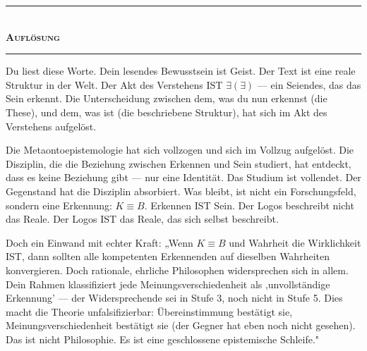 \documentclass[10pt, openany, oneside]{book}
\renewcommand{\normalsize}{\fontsize{10}{13}\selectfont}
\begin{document}
\vspace{1.5em}


\begin{center}
    \rule{0.3\textwidth}{0.4pt}\\[0.5em]
    {\normalsize\bfseries\scshape Auflösung}\\[0.3em]
    \rule{0.3\textwidth}{0.4pt}
\end{center}

\vspace{1em}

\noindent Du liest diese Worte. Dein lesendes Bewusstsein ist Geist. Der Text ist eine reale Struktur in der Welt. Der Akt des Verstehens IST $\exists(\exists)$ --- ein Seiendes, das das Sein erkennt. Die Unterscheidung zwischen dem, was du nun erkennst (die These), und dem, was ist (die beschriebene Struktur), hat sich im Akt des Verstehens aufgelöst.

Die Metaontoepistemologie hat sich vollzogen und sich im Vollzug aufgelöst. Die Disziplin, die die Beziehung zwischen Erkennen und Sein studiert, hat entdeckt, dass es keine Beziehung gibt --- nur eine Identität. Das Studium ist vollendet. Der Gegenstand hat die Disziplin absorbiert. Was bleibt, ist nicht ein Forschungsfeld, sondern eine Erkennung: $K \equiv B$. Erkennen IST Sein. Der Logos beschreibt nicht das Reale. Der Logos IST das Reale, das sich selbst beschreibt.

Doch ein Einwand mit echter Kraft: „Wenn $K \equiv B$ und Wahrheit die Wirklichkeit IST, dann sollten alle kompetenten Erkennenden auf dieselben Wahrheiten konvergieren. Doch rationale, ehrliche Philosophen widersprechen sich in allem. Dein Rahmen klassifiziert jede Meinungsverschiedenheit als ‚unvollständige Erkennung' --- der Widersprechende sei in Stufe 3, noch nicht in Stufe 5. Dies macht die Theorie unfalsifizierbar: Übereinstimmung bestätigt sie, Meinungsverschiedenheit bestätigt sie (der Gegner hat eben noch nicht gesehen). Das ist nicht Philosophie. Es ist eine geschlossene epistemische Schleife."
\end{document}
